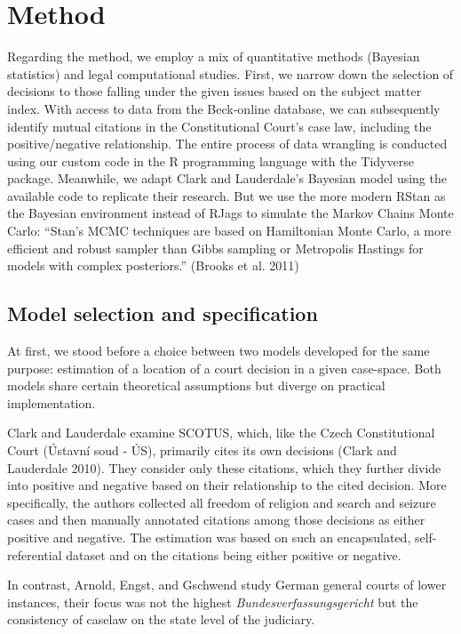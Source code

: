 \documentclass[
  11pt,
]{article}
\begin{document}
\hypertarget{method}{%
\section{Method}\label{method}}

Regarding the method, we employ a mix of quantitative methods (Bayesian
statistics) and legal computational studies. First, we narrow down the
selection of decisions to those falling under the given issues based on
the subject matter index. With access to data from the Beck-online
database, we can subsequently identify mutual citations in the
Constitutional Court's case law, including the positive/negative
relationship. The entire process of data wrangling is conducted using
our custom code in the R programming language with the Tidyverse
package. Meanwhile, we adapt Clark and Lauderdale's Bayesian model using
the available code to replicate their research. But we use the more
modern RStan as the Bayesian environment instead of RJags to simulate
the Markov Chains Monte Carlo: ``Stan's MCMC techniques are based on
Hamiltonian Monte Carlo, a more efficient and robust sampler than Gibbs
sampling or Metropolis Hastings for models with complex posteriors.''
(Brooks et al. 2011)

\hypertarget{model-selection-and-specification}{%
\subsection{Model selection and
specification}\label{model-selection-and-specification}}

At first, we stood before a choice between two models developed for the
same purpose: estimation of a location of a court decision in a given
case-space. Both models share certain theoretical assumptions but
diverge on practical implementation.

Clark and Lauderdale examine SCOTUS, which, like the Czech
Constitutional Court (Ústavní soud - ÚS), primarily cites its own
decisions (Clark and Lauderdale 2010). They consider only these
citations, which they further divide into positive and negative based on
their relationship to the cited decision. More specifically, the authors
collected all freedom of religion and search and seizure cases and then
manually annotated citations among those decisions as either positive
and negative. The estimation was based on such an encapsulated,
self-referential dataset and on the citations being either positive or
negative.

In contrast, Arnold, Engst, and Gschwend study German general courts of
lower instances, their focus was not the highest
\emph{Bundesverfassungsgericht} but the consistency of caselaw on the
state level of the judiciary.
\end{document}
